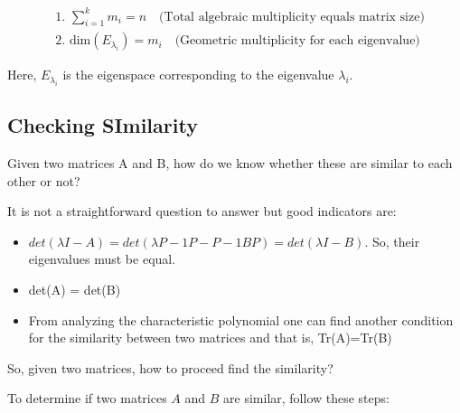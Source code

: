 \begin{align*}
&\text{1. } \sum_{i=1}^{k} m_i = n \quad \text{(Total algebraic multiplicity equals matrix size)} \\
&\text{2. } \text{dim}(E_{\lambda_i}) = m_i \quad \text{(Geometric multiplicity for each eigenvalue)}
\end{align*}


Here, $E_{\lambda_i}$ is the eigenspace corresponding to the eigenvalue $\lambda_i$.

\subsection{Checking SImilarity}

Given two matrices A and B, how do we know whether these are similar to each other or not?

It is not a straightforward question to answer but good indicators are: 

\begin{itemize}
    \item $det(\lambda I - A) = det(\lambda P-1P - P-1BP) = det(\lambda I - B)$.
So, their eigenvalues must be equal.
\item det(A) = det(B)
\item From analyzing the characteristic polynomial one can  find another condition for the similarity between two matrices and that is, Tr(A)=Tr(B)
\end{itemize}

So, given two matrices, how to proceed find the similarity?

To determine if two matrices $A$ and $B$ are similar, follow these steps:

